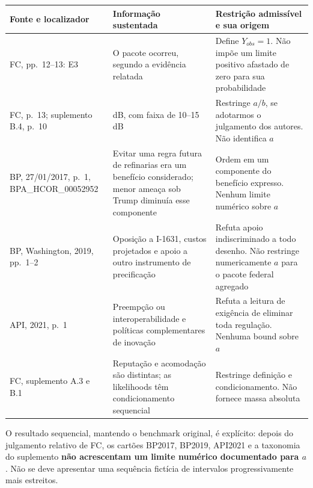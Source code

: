 \documentclass[
  brazilian,
  11pt,
  a4paper,
]{article}
\begin{document}
\begin{longtable}[]{@{}
  >{\raggedright\arraybackslash}p{}
  >{\raggedright\arraybackslash}p{}
  >{\raggedright\arraybackslash}p{}@{}}
\toprule\noalign{}
\begin{minipage}[b]{\linewidth}\raggedright
Fonte e localizador
\end{minipage} & \begin{minipage}[b]{\linewidth}\raggedright
Informação sustentada
\end{minipage} & \begin{minipage}[b]{\linewidth}\raggedright
Restrição admissível e sua origem
\end{minipage} \\
\midrule\noalign{}
\endhead
\bottomrule\noalign{}
\endlastfoot
FC, pp.~12--13: E3 & O pacote ocorreu, segundo a evidência relatada &
Define \(Y_{obs}=1\). Não impõe um limite positivo afastado de zero para
sua probabilidade \\
FC, p.~13; suplemento B.4, p.~10 & 12 dB, com faixa de 10--15 dB &
Restringe \(a/b\), se adotarmos o julgamento dos autores. Não identifica
\(a\) \\
BP, 27/01/2017, p.~1, BPA\_HCOR\_00052952 & Evitar uma regra futura de
refinarias era um benefício considerado; menor ameaça sob Trump diminuía
esse componente & Ordem em um componente do benefício expresso. Nenhum
limite numérico sobre \(a\) \\
BP, Washington, 2019, pp.~1--2 & Oposição a I-1631, custos projetados e
apoio a outro instrumento de precificação & Refuta apoio indiscriminado
a todo desenho. Não restringe numericamente \(a\) para o pacote federal
agregado \\
API, 2021, p.~1 & Preempção ou interoperabilidade e políticas
complementares de inovação & Refuta a leitura de exigência de eliminar
toda regulação. Nenhuma bound sobre \(a\) \\
FC, suplemento A.3 e B.1 & Reputação e acomodação são distintas; as
likelihoods têm condicionamento sequencial & Restringe definição e
condicionamento. Não fornece massa absoluta \\
\end{longtable}

O resultado sequencial, mantendo o benchmark original, é explícito:
depois do julgamento relativo de FC, os cartões BP2017, BP2019, API2021
e a taxonomia do suplemento \textbf{não acrescentam um limite numérico
documentado para \(a\)}. Não se deve apresentar uma sequência fictícia
de intervalos progressivamente mais estreitos.
\end{document}
